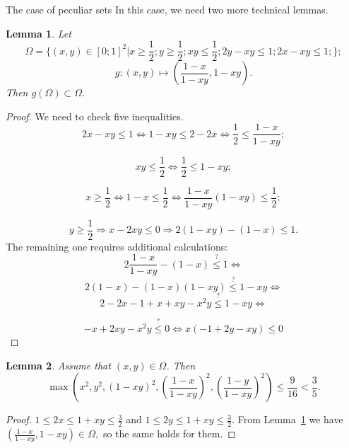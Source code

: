 \documentclass[12pt]{article}
\newtheorem{lemma}{Lemma}[section]
\begin{document}
\begin{section}{The case of peculiar sets}
\label{s7}
    In this case, we need two more technical lemmas. 
    \begin{lemma}
    \label{omega}
        Let 
        $$
            \Omega = \{(x,y) \in [0;1]^{2} | x\geq \frac{1}{2}; y\geq\frac{1}{2};xy\leq \frac{1}{2};2y-xy\leq 1; 2x-xy\leq 1;  \};
        $$
        $$
            g:(x,y)\mapsto \left(\frac{1-x}{1-xy}, 1-xy\right ).
        $$
        Then $g(\Omega)\subset \Omega.$
    \end{lemma}
    
    \begin{proof}
        
        We need to check five inequalities.
        $$
            2x-xy\leq 1 \Leftrightarrow 1 - xy \leq 2 -2x \Leftrightarrow \frac{1}{2} \leq \frac{1-x}{1-xy};
        $$
    
        $$
            xy \leq \frac{1}{2} \Leftrightarrow \frac{1}{2}\leq 1 - xy;
        $$
    
        $$
            x\geq \frac{1}{2} \Leftrightarrow 1 - x \leq \frac{1}{2} \Leftrightarrow \frac{1-x}{1-xy}(1-xy)\leq \frac{1}{2};
        $$
    
        $$
            y\geq \frac{1}{2} \Rightarrow x-2xy\leq 0 \Rightarrow 2(1-xy) - (1-x) \leq 1.
        $$
       The remaining one requires additional calculations:
        $$
            2\frac{1-x}{1-xy} - (1-x) \stackrel{?}{\leq} 1 \Leftrightarrow 
        $$
        $$
            2(1-x)- (1-x)(1-xy) \stackrel{?}{\leq} 1 -xy \Leftrightarrow
        $$
        $$
            2-2x- 1+x+xy-x^2y  \stackrel{?}{\leq} 1 -xy \Leftrightarrow
        $$
    
          $$
            -x + 2xy-x^2y  \stackrel{?}{\leq} 0 \Leftrightarrow x(-1 + 2y-xy)  
     \leq 0 
        $$
    \end{proof}
    
    \begin{lemma}
    \label{lemma7.2}
        Assume that  $(x,y)\in \Omega$. Then 
        $$
            \max \left(x^{2},y^{2},(1-xy)^{2}, \left(\frac{1-x}{1-xy}\right)^{2}, \left(\frac{1-y}{1-xy}\right)^{2}\right)\leq \frac{9}{16} < \frac{3}{5}.
        $$
    \end{lemma}
    
    \begin{proof}
        $1\leq 2x \leq 1 + xy \leq \frac{3}{2}$ and  $1\leq 2y \leq 1 + xy \leq \frac{3}{2}$.   From Lemma~\ref{omega} we have $  \left(\frac{1-x}{1-xy}, 1-xy\right ) \in \Omega, $ so the same holds for them. 
        

\end{proof}
\end{section}
\end{document}
